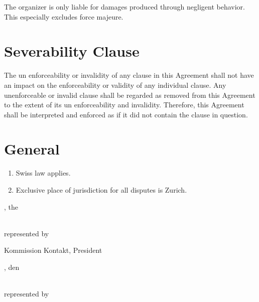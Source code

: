 The organizer is only liable for damages produced through negligent behavior. This especially excludes force majeure.


\section{Severability Clause}

The un enforceability or invalidity of any clause in this Agreement shall not have an
impact on the enforceability or validity of any individual clause. Any unenforceable
or invalid clause shall be regarded as removed from this Agreement to the extent of its
un enforceability and invalidity. Therefore, this Agreement shall be interpreted and
enforced as if it did not contain the clause in question.

\section{General}
\begin{enumerate}
\item Swiss law applies.
\item Exclusive place of jurisdiction for all disputes is Zurich.
\end{enumerate}

\vfill
\noindent
\begin{minipage}[t]{0.45\textwidth}
\amivcity, the \hrulefill

\bigskip\noindent
\amivname\\
represented by

\vspace{4em}
\hrulefill

\amivkontaktpresident

Kommission Kontakt, President
\end{minipage}%
\hspace{0.1\textwidth}
\begin{minipage}[t]{0.45\textwidth}
\makebox[8em]{\hrulefill}, den \hrulefill

\bigskip\noindent
\companyname\\
represented by

\vspace{4em}
\hrulefill

\companycontact\\

\end{minipage}
